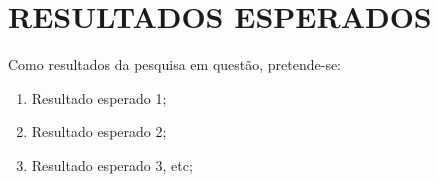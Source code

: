 \section{RESULTADOS ESPERADOS}
\label{sec:result}

Como resultados da pesquisa em questão, pretende-se:

\begin{enumerate}
    \item Resultado esperado 1;
    \item Resultado esperado 2;
    \item Resultado esperado 3, etc;
    
  \end{enumerate}

